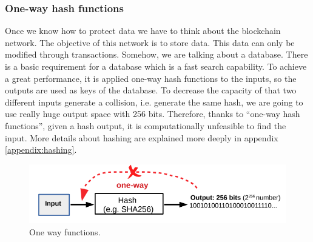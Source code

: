 \subsubsection{One-way hash functions}
{Once we know how to protect data we have to think about the blockchain network. The objective of this network is to store data. This data can only be modified through transactions. Somehow, we are talking about a database. There is a basic requirement for a database which is a fast search capability. To achieve a great performance, it is applied one-way hash functions to the inputs, so the outputs are used as keys of the database. To decrease the capacity of that two different inputs generate a collision, i.e. generate the same hash, we are going to use really huge output space with 256 bits. Therefore, thanks to ``one-way hash functions'', given a hash output, it is computationally unfeasible to find the input.
More details about hashing are explained more deeply in appendix \ref{appendix:hashing}}.
\begin{figure}[H]
\centering
\includegraphics[width=12cm]{img/chapter_2/one-way-hash-functions.png}
\caption[One way functions]{\footnotesize{One way functions.}}
\label{fig:one-way-functions}
\end{figure}

